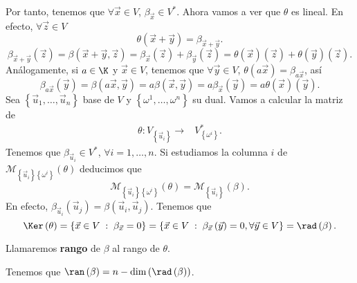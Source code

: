 Por tanto, tenemos que $\displaystyle \forall \vec{x} \in V $, $\displaystyle \beta_{\vec{x}} \in V^{*} $. Ahora vamos a ver que $\displaystyle \theta  $ es lineal. En efecto, $\displaystyle \forall \vec{z} \in V $  
\[\theta\left(\vec{x} + \vec{y}\right) = \beta_{\vec{x} + \vec{y}} .\]
\[ \beta_{\vec{x} + \vec{y}}\left(\vec{z}\right) = \beta\left(\vec{x} + \vec{y}, \vec{z}\right) = \beta_{\vec{x}}\left(\vec{z}\right) + \beta_{\vec{y}}\left(\vec{z}\right) = \theta\left(\vec{x}\right)(\vec{z}) + \theta\left(\vec{y}\right)\left(\vec{z}\right) .\]
Análogamente, si $\displaystyle a \in \K $ y $\displaystyle \vec{x} \in V $, tenemos que $\displaystyle \forall \vec{y} \in V $, $\displaystyle \theta\left(a\vec{x}\right) = \beta_{a\vec{x}} $, así
\[ \beta_{a\vec{x}}\left(\vec{y}\right) = \beta\left(a\vec{x}, \vec{y}\right) = a\beta\left(\vec{x}, \vec{y}\right) = a\beta_{\vec{x}}\left(\vec{y}\right) = a\theta\left(\vec{x}\right)\left(\vec{y}\right).\]
Sea $\displaystyle \left\{ \vec{u}_{1}, \ldots, \vec{u}_{n}\right\}  $ base de $\displaystyle V $ y $\displaystyle \left\{ \omega^{1}, \ldots, \omega^{n}\right\}  $ su dual. Vamos a calcular la matriz de 
\[
\begin{split}
	\theta : V _{ \left\{ \vec{u}_{i}\right\} } \to & V^{*}_{ \left\{ \omega^{i}\right\} } .
\end{split}
\]
Tenemos que $\displaystyle \beta_{\vec{u}_{i}} \in V^{*} $, $\displaystyle \forall i = 1, \ldots, n $. Si estudiamos la columna $\displaystyle i $ de $\displaystyle \mathcal{M}_{ \left\{ \vec{u}_{i}\right\} \left\{ \omega^{i}\right\} }\left(\theta\right) $ deducimos que 
\[ \mathcal{M}_{ \left\{ \vec{u}_{i}\right\} \left\{ \omega^{i}\right\} }\left(\theta \right) = \mathcal{M}_{ \left\{ \vec{u}_{i}\right\} }\left(\beta\right) .\]
En efecto, $\displaystyle \beta_{\vec{u}_{i}}\left(\vec{u}_{j}\right) = \beta\left(\vec{u}_{i}, \vec{u}_{j}\right) $.
Tenemos que 
\[ \Ker\left(\theta \right) = \left\{ \vec{x} \in V \; : \; \beta_{\vec{x}} = 0\right\} = \left\{ \vec{x} \in V \; : \; \beta_{\vec{x}}\left(\vec{y}\right) = 0, \forall \vec{y}\in V\right\} = \rad\left(\beta\right) .\]
\begin{fdefinition}[Rango]
\normalfont Llamaremos \textbf{rango} de $\displaystyle \beta  $ al rango de $\displaystyle \theta $. 
\end{fdefinition}
\begin{observation}
\normalfont Tenemos que $\displaystyle \ran\left(\beta \right) = n - \dim\left(\rad\left(\beta \right)\right) $.
\end{observation}
